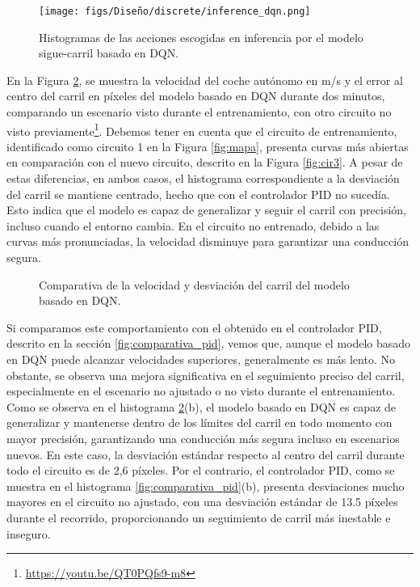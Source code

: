 \begin{figure}[ht]
\centering
\texttt{[image: figs/Diseño/discrete/inference\_dqn.png]}
\caption{Histogramas de las acciones escogidas en inferencia por el modelo sigue-carril basado en \ac{DQN}.}
\label{fig:inference_dqn}
\end{figure}

En la Figura \ref{fig:comparativa_dqn}, se muestra la velocidad del coche autónomo en m/s y el error al centro del carril en píxeles del modelo basado en \ac{DQN} durante dos minutos, comparando un escenario visto durante el entrenamiento\footnotemark[3], con otro circuito no visto previamente\footnote{\url{https://youtu.be/QT0PQfs9-m8}}. Debemos tener en cuenta que el circuito de entrenamiento, identificado como circuito 1 en la Figura \ref{fig:mapa}, presenta curvas más abiertas en comparación con el nuevo circuito, descrito en la Figura \ref{fig:cir3}. A pesar de estas diferencias, en ambos casos, el histograma correspondiente a la desviación del carril se mantiene centrado, hecho que con el controlador \ac{PID} no sucedía. Esto indica que el modelo es capaz de generalizar y seguir el carril con precisión, incluso cuando el entorno cambia. En el circuito no entrenado, debido a las curvas más pronunciadas, la velocidad disminuye para garantizar una conducción segura.

\begin{figure}[ht]
\centering
{}
\hfill
{}
\caption{Comparativa de la velocidad y desviación del carril del modelo basado en \ac{DQN}.}
\label{fig:comparativa_dqn}
\end{figure}
\newpage

Si comparamos este comportamiento con el obtenido en el controlador \ac{PID}, descrito en la sección \ref{fig:comparativa_pid}, vemos que, aunque el modelo basado en \ac{DQN} puede alcanzar velocidades superiores, generalmente es más lento. No obstante, se observa una mejora significativa en el seguimiento preciso del carril, especialmente en el escenario no ajustado o no visto durante el entrenamiento. Como se observa en el histograma \ref{fig:comparativa_dqn}(b), el modelo basado en \ac{DQN} es capaz de generalizar y mantenerse dentro de los límites del carril en todo momento con mayor precisión, garantizando una conducción más segura incluso en escenarios nuevos. En este caso, la desviación estándar respecto al centro del carril durante todo el circuito es de 2,6 píxeles. Por el contrario, el controlador \ac{PID}, como se muestra en el histograma \ref{fig:comparativa_pid}(b), presenta desviaciones mucho mayores en el circuito no ajustado, con una desviación estándar de 13.5 píxeles durante el recorrido, proporcionando un seguimiento de carril más inestable e inseguro.

